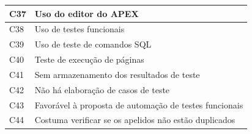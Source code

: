 \begin{longtable}{|M{1.3cm} | m{14.0cm}|}
C37            & Uso do editor do APEX                                                                                                                                                                                                                                             \\ \hline
C38            & Uso de testes funcionais                                                                                                                                                                                                                                          \\ \hline
C39            & Uso de teste de comandos SQL                                                                                                                                                                                                                                      \\ \hline
C40            & Teste de execução de páginas                                                                                                                                                                                                                                      \\ \hline
C41            & Sem armazenamento dos resultados de teste                                                                                                                                                                                                                         \\ \hline
C42            & Não há elaboração de casos de teste                                                                                                                                                                                                                               \\ \hline
C43            & Favorável à proposta de automação de testes funcionais                                                                                                                                                                                                            \\ \hline
C44            & Costuma verificar se os apelidos não estão duplicados                                                                                                                                                                                                             \\ \hline

\end{longtable}
